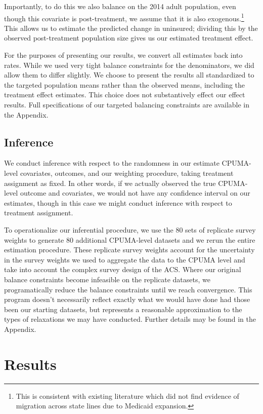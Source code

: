 \documentclass[final]{article}
\begin{document}
Importantly, to do this we also balance on the 2014 adult population, even though this covariate is post-treatment, we assume that it is also exogenous.\footnote{This is consistent with existing literature which did not find evidence of migration across state lines due to Medicaid expansion.} This allows us to estimate the predicted change in uninsured; dividing this by the observed post-treatment population size gives us our estimated treatment effect. 

For the purposes of presenting our results, we convert all estimates back into rates. While we used very tight balance constraints for the denominators, we did allow them to differ slightly. We choose to present the results all standardized to the targeted population means rather than the observed means, including the treatment effect estimates. This choice does not substantively effect our effect results. Full specifications of our targeted balancing constraints are available in the Appendix.

\subsection{Inference}

We conduct inference with respect to the randomness in our estimate CPUMA-level covariates, outcomes, and our weighting procedure, taking treatment assignment as fixed. In other words, if we actually observed the true CPUMA-level outcome and covariates, we would not have any confidence interval on our estimates, though in this case we might conduct inference with respect to treatment assignment.

To operationalize our inferential procedure, we use the 80 sets of replicate survey weights to generate 80 additional CPUMA-level datasets and we rerun the entire estimation procedure. These replicate survey weights account for the uncertainty in the survey weights we used to aggregate the data to the CPUMA level and take into account the complex survey design of the ACS. Where our original balance constraints become infeasible on the replicate datasets, we programatically reduce the balance constraints until we reach convergence. This program doesn't necessarily reflect exactly what we would have done had those been our starting datasets, but represents a reasonable approximation to the types of relaxations we may have conducted. Further details may be found in the Appendix.

\section{Results}
\end{document}
